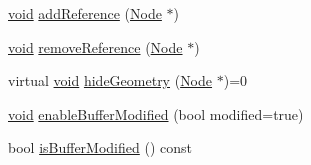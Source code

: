 \begin{DoxyCompactItemize}
\item 
\mbox{\hyperlink{_thread_8h_af1e856da2e658414cb2456cb6f7ebc66}{void}} \mbox{\hyperlink{classnjli_1_1_geometry_aaf9879b9197998f1a63dac38ead6354c}{add\+Reference}} (\mbox{\hyperlink{classnjli_1_1_node}{Node}} $\ast$)
\item 
\mbox{\hyperlink{_thread_8h_af1e856da2e658414cb2456cb6f7ebc66}{void}} \mbox{\hyperlink{classnjli_1_1_geometry_a39b63002b1e195651b30186319f5cf6d}{remove\+Reference}} (\mbox{\hyperlink{classnjli_1_1_node}{Node}} $\ast$)
\item 
virtual \mbox{\hyperlink{_thread_8h_af1e856da2e658414cb2456cb6f7ebc66}{void}} \mbox{\hyperlink{classnjli_1_1_geometry_a3780bbd093a4b163de3499e5726667f9}{hide\+Geometry}} (\mbox{\hyperlink{classnjli_1_1_node}{Node}} $\ast$)=0
\item 
\mbox{\hyperlink{_thread_8h_af1e856da2e658414cb2456cb6f7ebc66}{void}} \mbox{\hyperlink{classnjli_1_1_geometry_a3729511d4f34251e0ac1df3135c2a00f}{enable\+Buffer\+Modified}} (bool modified=true)
\item 
bool \mbox{\hyperlink{classnjli_1_1_geometry_a7d8e8d24bb0b2ed0e19bb214cb7f512d}{is\+Buffer\+Modified}} () const
\end{DoxyCompactItemize}

